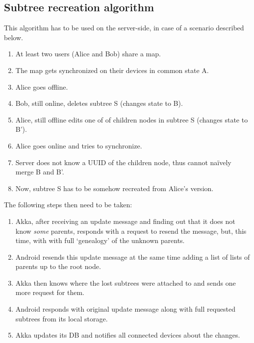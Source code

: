 %
%
%
%
%

\subsection{Subtree recreation algorithm}
\label{subsec:subtree-recreation}

This algorithm has to be used on the server-side, in case of a scenario described below.

\begin{enumerate}
	\item At least two users (Alice and Bob) share a map.
	\item The map gets synchronized on their devices in common state A.
	\item Alice goes offline.
	\item Bob, still online, deletes subtree S (changes state to B).
	\item Alice, still offline edits one of of children nodes in subtree S (changes state to B').
	\item Alice goes online and tries to synchronize.
	\item Server does not know a UUID of the children node, thus cannot naïvely merge B and B'.
	\item Now, subtree S has to be somehow recreated from Alice's version.
\end{enumerate}

The following steps then need to be taken:

\begin{enumerate}
	\item Akka, after receiving an update message and finding out that it does not know \emph{some} parents, responds with a request to resend the message, but, this time, with with full `genealogy' of the unknown parents.
	\item Android resends this update message at the same time adding a list of lists of parents up to the root node.
	\item Akka then knows where the lost subtrees were attached to and sends one more request for them.
	\item Android responds with original update message along with full requested subtrees from its local storage.
	\item Akka updates its DB and notifies all connected devices about the changes.
\end{enumerate}

